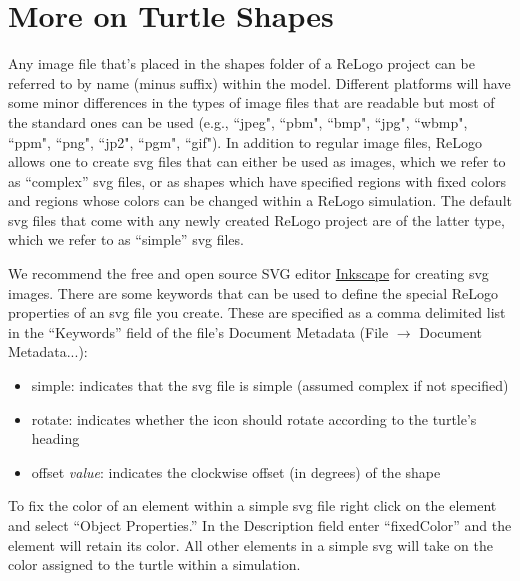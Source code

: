\documentclass[11pt]{amsart}
\begin{document}
\clearpage
\section{More on Turtle Shapes}
\label{app:drawing}
Any image file that's placed in the shapes folder of a ReLogo project can be referred to by name (minus suffix) within the model. Different platforms will have some minor differences in the types of image files that are readable but most of the standard ones can be used (e.g., ``jpeg", ``pbm", ``bmp", ``jpg", ``wbmp", ``ppm", ``png", ``jp2", ``pgm", ``gif"). In addition to regular image files, ReLogo allows one to create svg files that can either be used as images, which we refer to as ``complex'' svg files, or as shapes which have specified regions with fixed colors and regions whose colors can be changed within a ReLogo simulation. The default svg files that come with any newly created ReLogo project are of the latter type, which we refer to as ``simple'' svg files.

We recommend the free and open source SVG editor \href{http://inkscape.org/}{Inkscape} for creating svg images. There are some keywords that can be used to define the special ReLogo properties of an svg file you create. These are specified as a comma delimited list in the ``Keywords'' field of the file's Document Metadata (File $\rightarrow$ Document Metadata...):
\begin{itemize}
  \item simple: indicates that the svg file is simple (assumed complex if not specified)
  \item rotate: indicates whether the icon should rotate according to the turtle's heading 
  \item offset \emph{value}: indicates the clockwise offset (in degrees) of the shape
\end{itemize}

To fix the color of an element within a simple svg file right click on the element and select ``Object Properties.'' In the Description field enter ``fixedColor'' and the element will retain its color. All other elements in a simple svg will take on the color assigned to the turtle within a simulation.
\end{document}
